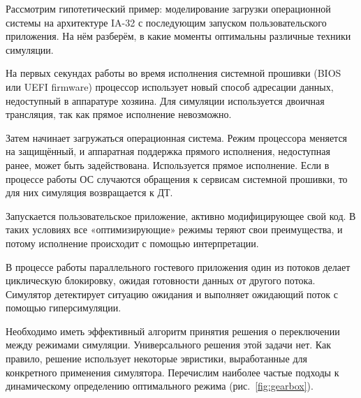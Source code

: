 Рассмотрим гипотетический пример: моделирование загрузки операционной системы на архитектуре IA-32 с последующим запуском пользовательского приложения. На нём разберём, в какие моменты оптимальны различные техники симуляции.
 
\begin{itemize*}
\item На первых секундах работы во время исполнения системной прошивки (BIOS или UEFI firmware) процессор использует новый способ адресации данных, недоступный в аппаратуре хозяина. Для симуляции используется двоичная трансляция, так как прямое исполнение невозможно.


\item Затем начинает загружаться операционная система. Режим процессора меняется на защищённый, и аппаратная поддержка прямого исполнения, недоступная ранее, может быть задействована. Используется прямое исполнение. Если в процессе работы ОС случаются обращения к сервисам системной прошивки, то для них симуляция возвращается к ДТ.

\item Запускается пользовательское приложение, активно модифицирующее свой код. В таких условиях все «оптимизирующие» режимы теряют свои преимущества, и потому исполнение происходит с помощью интерпретации.

\item В процессе работы параллельного гостевого приложения один из потоков делает циклическую блокировку, ожидая готовности данных от другого потока. Симулятор детектирует ситуацию ожидания и выполняет ожидающий поток с помощью гиперсимуляции.

\end{itemize*}

Необходимо иметь эффективный алгоритм принятия решения о переключении между режимами симуляции. Универсального решения этой задачи нет. Как правило, решение использует некоторые эвристики, выработанные для конкретного применения симулятора. Перечислим наиболее частые подходы к динамическому определению оптимального режима (рис.~\ref{fig:gearbox}).

